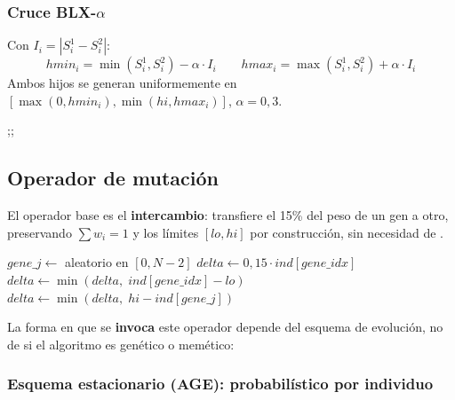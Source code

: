 \documentclass[12pt,a4paper]{article}
\begin{document}
\subsubsection*{Cruce BLX-$\alpha$}
Con $I_i = |S^1_i - S^2_i|$:
\[
  hmin_i = \min(S^1_i, S^2_i) - \alpha \cdot I_i \qquad
  hmax_i = \max(S^1_i, S^2_i) + \alpha \cdot I_i
\]
Ambos hijos se generan uniformemente en $[\max(0,hmin_i),\min(hi,hmax_i)]$, $\alpha=0{,}3$.

\begin{algorithm}[H]
\caption{Cruce BLX-$\alpha$($S^1$, $S^2$, problema), $\alpha=0{,}3$}
 
;\quad {};\quad {}
\end{algorithm}

\subsection{Operador de mutación}

El operador base es el \textbf{intercambio}: transfiere el 15\% del peso de un gen a otro, preservando $\sum w_i=1$ y los límites $[lo,hi]$ por construcción, sin necesidad de \fix{}.

\begin{algorithm}[H]
\caption{Mutación-intercambio($ind$, $gene\_idx$, problema)}
$gene\_j \leftarrow$ aleatorio en $[0, N-2]$\;
$delta \leftarrow 0{,}15 \cdot ind[gene\_idx]$\;
$delta \leftarrow \min(delta,\; ind[gene\_idx] - lo)$\;
$delta \leftarrow \min(delta,\; hi - ind[gene\_j])$\;
\end{algorithm}

La forma en que se \textbf{invoca} este operador depende del esquema de evolución, no de si el algoritmo es genético o memético:

\subsubsection*{Esquema estacionario (AGE): probabilístico por individuo}
\end{document}
